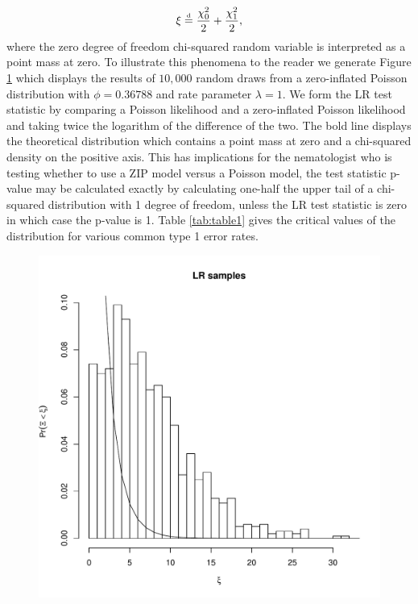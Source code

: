 \documentclass{article}
\newcommand\eqdist{\mathrel{\stackrel{\makebox[0pt]{\mbox{\normalfont\tiny d}}}{=}}}
\begin{document}
\begin{equation}
\xi \eqdist \frac{\chi^2_0}{2} + \frac{\chi^2_1}{2},
\end{equation}
where the zero degree of freedom chi-squared random variable is interpreted as a point mass at zero. To illustrate this phenomena to the reader we generate Figure \ref{fig:twice_log_likelihood} which displays the results of $10,000$ random draws from a zero-inflated Poisson distribution with $\phi=0.36788$ and rate parameter $\lambda=1$. 
We form the LR test statistic by comparing a Poisson likelihood and a zero-inflated Poisson likelihood and taking twice the logarithm of the difference of the two. The bold line displays the  theoretical distribution which contains a point mass at zero and a chi-squared density on the positive axis. This has implications for the nematologist who is testing whether to use a ZIP model versus a Poisson model, the test statistic p-value may be calculated exactly by calculating one-half the upper tail of a chi-squared distribution with 1 degree of freedom, unless the LR test statistic is zero in which case the p-value is 1. Table \ref{tab:table1} gives the critical values of the distribution for various common type 1 error rates. 

\begin{figure}[H]
\label{fig:twice_log_likelihood}
\vspace{0.5in}
\begin{center}
\includegraphics[scale=0.6]{hist.pdf}
\end{center}
\end{figure}
\end{document}
